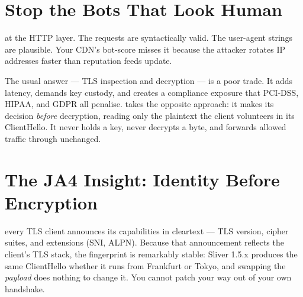 
\section{Stop the Bots That Look Human}

at the HTTP layer. The requests are syntactically valid. The user-agent strings are
plausible. Your CDN's bot-score misses it because the attacker rotates IP addresses
faster than reputation feeds update.


The usual answer --- TLS inspection and decryption --- is a poor trade. It adds
latency, demands key custody, and creates a compliance exposure that PCI-DSS,
HIPAA, and GDPR all penalise. \ja{} takes the opposite approach: it makes its
decision \emph{before} decryption, reading only the plaintext the client
volunteers in its ClientHello. It never holds a key, never decrypts a byte, and
forwards allowed traffic through unchanged.

\section{The JA4 Insight: Identity Before Encryption}

 every TLS client
announces its capabilities in cleartext --- TLS version, cipher suites, and
extensions (SNI, ALPN). Because that announcement reflects the client's TLS stack,
the fingerprint is remarkably stable: Sliver 1.5.x produces the same ClientHello
whether it runs from Frankfurt or Tokyo, and swapping the \emph{payload} does
nothing to change it. You cannot patch your way out of your own handshake.

